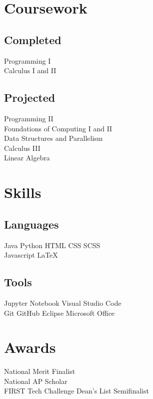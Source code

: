 \documentclass[]{deedy-resume}
\begin{document}
\begin{minipage}[t]{0.33\textwidth}

\section{Coursework}

\subsection{Completed}
Programming I \\
Calculus I and II \\
\sectionsep

\subsection{Projected}
Programming II \\
Foundations of Computing I and II \\
Data Structures and Parallelism \\
Calculus III \\
Linear Algebra \\


\section{Skills}
\subsection{Languages}
Java \textbullet{} Python \textbullet{} HTML \textbullet{} CSS \textbullet{} SCSS \\
Javascript \textbullet{} LaTeX
\sectionsep

\subsection{Tools}
Jupyter Notebook \textbullet{} Visual Studio Code \\
Git \textbullet{} GitHub \textbullet{} Eclipse \textbullet{} Microsoft Office
\sectionsep


\section{Awards}
National Merit Finalist\\
National AP Scholar \\
FIRST Tech Challenge Dean's List Semifinalist \\
\sectionsep

%
%

\end{minipage} 
\end{document}
